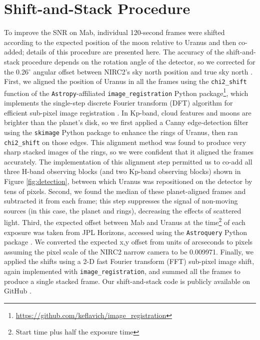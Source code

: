 \documentclass[preprint]{aastex631}
\begin{document}
\restartappendixnumbering

\section{Shift-and-Stack Procedure}
\label{s:shiftandstack}

To improve the SNR on Mab, individual 120-second frames were shifted according to the expected position of the moon relative to Uranus and then co-added; details of this procedure are presented here. The accuracy of the shift-and-stack procedure depends on the rotation angle of the detector, so we corrected for the 0.26$^\circ$ angular offset between NIRC2's sky north position and true sky north \citep{service16}. First, we aligned the position of Uranus in all the frames using the \texttt{chi2\_shift} function of the \texttt{Astropy}-affiliated \texttt{image\_registration} Python package\footnote{\url{https://github.com/keflavich/image_registration}}, which implements the single-step discrete Fourier transform (DFT) algorithm for efficient sub-pixel image registration \citep{guizarsicairos08}. In Kp-band, cloud features and moons are brighter than the planet's disk, so we first applied a Canny edge-detection filter using the \texttt{skimage} Python package \citep{skimage14} to enhance the rings of Uranus, then ran \texttt{chi2\_shift} on those edges. This alignment method was found to produce very sharp stacked images of the rings, so we were confident that it aligned the frames accurately. The implementation of this alignment step permitted us to co-add all three H-band observing blocks (and two Kp-band observing blocks) shown in Figure \ref{fig:detection}, between which Uranus was repositioned on the detector by tens of pixels.  Second, we found the median of these planet-aligned frames and subtracted it from each frame; this step suppresses the signal of non-moving sources (in this case, the planet and rings), decreasing the effects of scattered light. Third, the expected offset between Mab and Uranus at the time\footnote{Start time plus half the exposure time} of each exposure was taken from JPL Horizons, accessed using the \texttt{Astroquery} Python package \citep{ginsburg19}. We converted the expected x,y offset from units of arcseconds to pixels assuming the pixel scale of the NIRC2 narrow camera to be 0.009971\arcsec \citep{service16}. Finally, we applied the shifts using a 2-D fast Fourier transform (FFT) sub-pixel image shift, again implemented with \texttt{image\_registration}, and summed all the frames to produce a single stacked frame. Our shift-and-stack code is publicly available on GitHub \citep{shift_stack_moons23}.
\end{document}
